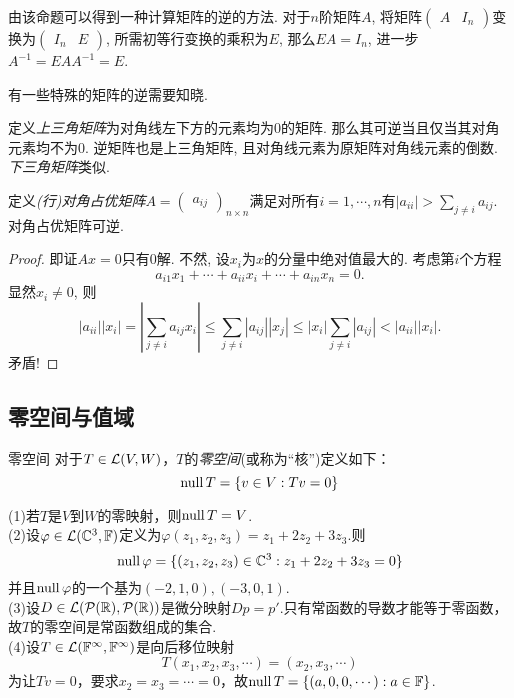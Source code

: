 由该命题可以得到一种计算矩阵的逆的方法. 对于$n$阶矩阵$A$, 将矩阵$\begin{pmatrix}
	A & I_n
\end{pmatrix}$变换为$\begin{pmatrix}
	I_n & E
\end{pmatrix}$, 所需初等行变换的乘积为$E$, 那么$EA=I_n$, 进一步$A^{-1} = EAA^{-1}=E$. 

有一些特殊的矩阵的逆需要知晓. 

定义\textit{上三角矩阵}为对角线左下方的元素均为$0$的矩阵. 那么其可逆当且仅当其对角元素均不为$0$. 逆矩阵也是上三角矩阵, 且对角线元素为原矩阵对角线元素的倒数. \textit{下三角矩阵}类似. 

定义\textit{(行)对角占优矩阵}$A=\begin{pmatrix}
	a_{ij}
\end{pmatrix}_{n\times n}$满足对所有$i=1,\cdots ,n$有$|a_{ii}|>\sum_{j\neq i}a_{ij}$. 对角占优矩阵可逆. 

\begin{proof}
	即证$Ax=0$只有$0$解. 不然, 设$x_i$为$x$的分量中绝对值最大的. 考虑第$i$个方程$$a_{i1}x_1 + \cdots + a_{ii}x_i + \cdots + a_{in}x_n = 0.$$
	显然$x_i \neq 0$, 则$$|a_{ii}||x_i| = \left| \sum_{j\neq i} a_{ij}x_i \right| \leq \sum_{j\neq i} |a_{ij}||x_j| \leq |x_i|\sum_{j\neq i} |a_{ij}| < |a_{ii}||x_i|.$$
	矛盾! 
\end{proof}

\subsection{零空间与值域}

\begin{definition}{零空间}
	对于$T \in \mathcal{L} (V,W)$，$T$的\textit{零空间}(或称为“核”)定义如下：$$\operatorname{null} T = \{ v \in V:Tv=0 \}$$
\end{definition}

\begin{example}{}
	(1)若$T$是$V$到$W$的零映射，则$\operatorname{null} T=V$. \\
	(2)设$\varphi \in \mathcal{L} (\mathbb{C} ^3,\mathbb{F})$定义为$\varphi (z_1,z_2,z_3)=z_1+2z_2+3z_3$.则$$\operatorname{null} \varphi = \{ (z_1,z_2,z_3) \in \mathbb{C} ^3 : z_1+2z_2+3z_3=0 \}$$
	并且$\operatorname{null} \varphi$的一个基为$(-2,1,0),(-3,0,1)$. \\
	(3)设$D \in \mathcal{L} (\mathcal{P}(\mathbb{R}),\mathcal{P}(\mathbb{R}))$是微分映射$Dp=p'$.只有常函数的导数才能等于零函数，故$T$的零空间是常函数组成的集合. \\
	(4)设$T \in \mathcal{L} (\mathbb{F} ^{\infty},\mathbb{F} ^{\infty})$是向后移位映射$$T(x_1,x_2,x_3, \cdots )=(x_2,x_3,\cdots )$$
	为让$Tv=0$，要求$x_2=x_3=\cdots =0$，故$\operatorname{null} T = \{ (a,0,0,\cdots ) :a \in \mathbb{F} \}$.
\end{example}

